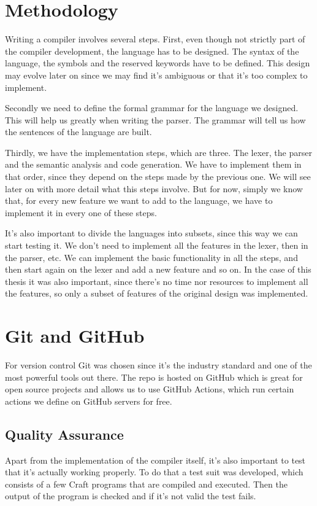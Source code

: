 ﻿\documentclass[10pt,a4paper,twocolumn,twoside]{article}
\begin{document}
\section{Methodology}
Writing a compiler involves several steps. First, even though not strictly part
of the compiler development, the language has to be designed. The syntax of the
language, the symbols and the reserved keywords have to be defined. This design
may evolve later on since we may find it's ambiguous or that it's too complex to
implement.

Secondly we need to define the formal grammar for the language we designed. This
will help us greatly when writing the parser. The grammar will tell us how the
sentences of the language are built.

Thirdly, we have the implementation steps, which are three. The lexer, the
parser and the semantic analysis and code generation. We have to implement them
in that order, since they depend on the steps made by the previous one.  We will
see later on with more detail what this steps involve. But for now, simply we
know that, for every new feature we want to add to the language, we have to
implement it in every one of these steps.

It's also important to divide the languages into subsets, since this way we 
can start testing it. We don't need to implement all the features in the lexer,
then in the parser, etc. We can implement the basic functionality in all the 
steps, and then start again on the lexer and add a new feature and so on. In the
case of this thesis it was also important, since there's no time nor resources
to implement all the features, so only a subset of features of the original 
design was implemented.

\section{Git and GitHub}
For version control Git was chosen since it's the industry standard and one of
the most powerful tools out there. The repo is hosted on GitHub which is great
for open source projects and allows us to use GitHub Actions, which run certain
actions we define on GitHub servers for free.

\subsection{Quality Assurance}
Apart from the implementation of the compiler itself, it's also important to 
test that it's actually working properly. To do that a test suit was developed,
which consists of a few Craft programs that are compiled and executed. Then 
the output of the program is checked and if it's not valid the test fails.
\end{document}
